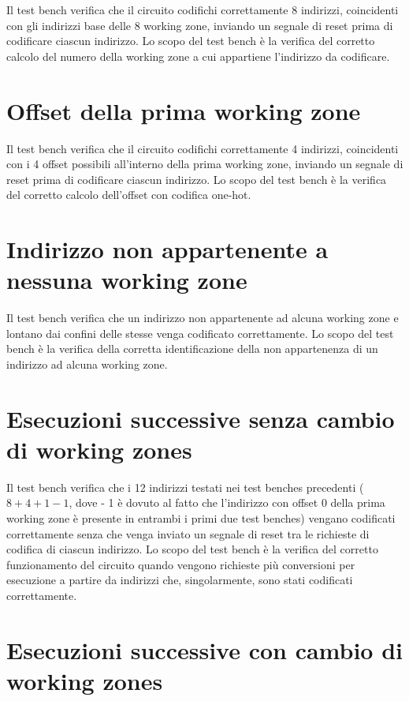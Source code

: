 \documentclass[10pt,english, openany]{book}
\begin{document}
Il test bench verifica che il circuito codifichi correttamente 8 indirizzi, coincidenti con gli indirizzi base delle 8 working zone, inviando un segnale di reset prima di codificare ciascun indirizzo. Lo scopo del test bench è la verifica del corretto calcolo del numero della working zone a cui appartiene l’indirizzo da codificare.

\section{Offset della prima working zone}

Il test bench verifica che il circuito codifichi correttamente 4 indirizzi, coincidenti con i 4 offset possibili all’interno della prima working zone, inviando un segnale di reset prima di codificare ciascun indirizzo. Lo scopo del test bench è la verifica del corretto calcolo dell’offset con codifica one-hot.

\section{Indirizzo non appartenente a nessuna working zone}

Il test bench verifica che un indirizzo non appartenente ad alcuna working zone e lontano dai confini delle stesse venga codificato correttamente. Lo scopo del test bench è la verifica della corretta identificazione della non appartenenza di un indirizzo ad alcuna working zone.

\section{Esecuzioni successive senza cambio di working zones}

Il test bench verifica che i 12 indirizzi testati nei test benches precedenti ($8 + 4 + 1 - 1$, dove - 1 è dovuto al fatto che l’indirizzo con offset 0 della prima working zone è presente in entrambi i primi due test benches) vengano codificati correttamente senza che venga inviato un segnale di reset tra le richieste di codifica di ciascun indirizzo. Lo scopo del test bench è la verifica del corretto funzionamento del circuito quando vengono richieste più conversioni per esecuzione a partire da indirizzi che, singolarmente, sono stati codificati correttamente.

\section{Esecuzioni successive con cambio di working zones}
\end{document}
